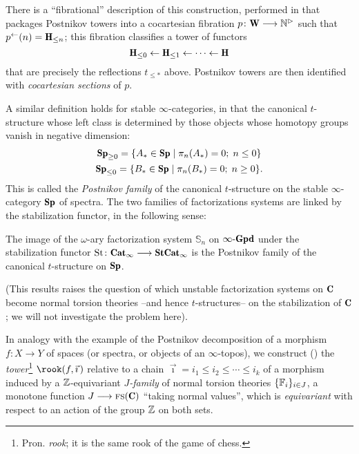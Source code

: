\begin{remark}
There is a ``fibrational'' description of this construction, performed in \cite[5.5.6.24]{HTT} that packages Postnikov towers into a cocartesian fibration $p \colon \cate{W} \to \mathbb{N}^\rhd$ such that $p^\leftarrow(n) = \H_{\le n}$; this fibration classifies a tower of functors
\[
\H_{\le 0} \leftarrow \H_{\le 1}\leftarrow \cdots \leftarrow \H
\]
that are precisely the reflections $t_{\le *}$ above. Postnikov towers are then identified with \emph{cocartesian sections} of $p$.
\end{remark}
A similar definition holds for stable $\infty$-categories, in that the canonical $t$-structure whose left class is determined by those objects whose homotopy groups vanish in negative dimension:
\begin{gather*}
\cate{Sp}_{\ge 0} = \{  A_* \in \cate{Sp} \mid \pi_n(A_*)=0;\; n\le 0 \}\\
\cate{Sp}_{\le 0} = \{ B_* \in \cate{Sp} \mid \pi_n(B_*)=0;\; n\ge 0 \}.
\end{gather*}
This is called the \emph{Postnikov family} of the canonical $t$-structure on the stable $\infty$-category $\cate{Sp}$ of spectra. The two families of factorizations systems are linked by the stabilization functor, in the following sense:
\begin{proposition}
The image of the $\omega$-ary factorization system $\mathbb{S}_n$ on $\iGpd$ under the stabilization functor $\text{St}\colon \cate{Cat}_\infty \to \cate{StCat}_\infty$ is the Postnikov family of the canonical $t$-structure on $\cate{Sp}$.
\end{proposition}
(This results raises the question of which unstable factorization systems on $\C$ become normal torsion theories --and hence $t$-structures-- on the stabilization of $\C$; we will not investigate the problem here).

In analogy with the example of the Postnikov decomposition of a morphism $f\colon X\to Y$ of spaces (or spectra, or objects of an $\infty$-topos), we construct (\adef {}) the \emph{tower}\footnote{Pron. \emph{rook}; it is the same rook of the game of chess.} $\rook(f,\vec \imath\,)$ relative to a chain $\vec\imath = i_1\leq i_2\leq\cdots \leq i_k$ of a morphism induced by a $\mathbb{Z}$-equivariant \emph{$J$-family} of normal torsion theories $\{\mathbb{F}_i\}_{i\in J}$, \ie a monotone function $J \to\fs(\C)$ ``taking normal values'', which is \emph{equivariant} with respect to an action of the group $\mathbb{Z}$ on both sets.

